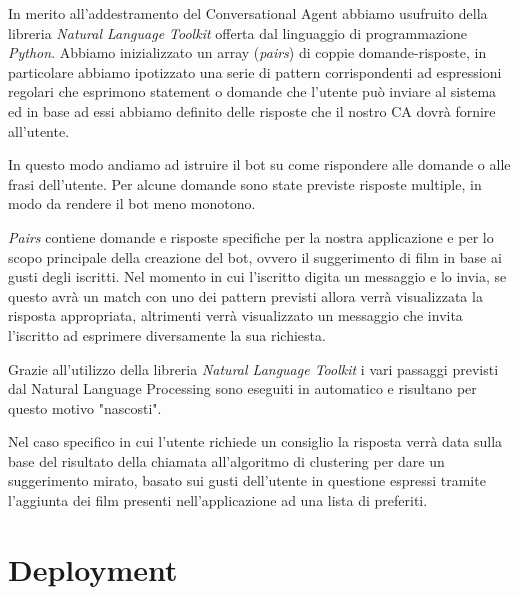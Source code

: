 \documentclass[a4paper, 10pt]{report}
\begin{document}
        In merito all'addestramento del Conversational Agent abbiamo usufruito della libreria \textit{Natural Language Toolkit}
        offerta dal linguaggio di programmazione \textit{Python}. Abbiamo inizializzato un array (\textit{pairs}) di coppie domande-risposte,
        in particolare abbiamo ipotizzato una serie di pattern corrispondenti ad espressioni regolari che esprimono statement o domande che
        l'utente può inviare al sistema ed in base ad essi abbiamo definito delle risposte che il nostro CA dovrà fornire all'utente.

        In questo modo andiamo ad istruire il bot su come rispondere alle domande o alle frasi dell'utente. Per alcune domande
        sono state previste risposte multiple, in modo da rendere il bot meno monotono.

        \textit{Pairs} contiene domande e risposte specifiche per la nostra applicazione e per lo scopo
        principale della creazione del bot, ovvero il suggerimento di film in base ai gusti degli iscritti.
        Nel momento in cui l'iscritto digita un messaggio e lo invia, se questo avrà un match con uno dei pattern previsti allora
        verrà visualizzata la risposta appropriata, altrimenti verrà visualizzato un messaggio che invita l'iscritto
        ad esprimere diversamente la sua richiesta.

        Grazie all'utilizzo della libreria \textit{Natural Language Toolkit} i vari passaggi previsti dal Natural Language Processing
        sono eseguiti in automatico e risultano per questo motivo "nascosti".

        Nel caso specifico in cui l'utente richiede un consiglio la risposta verrà data sulla base del risultato della chiamata
        all'algoritmo di clustering per dare un suggerimento mirato, basato sui gusti dell'utente in questione espressi tramite
        l'aggiunta dei film presenti nell'applicazione ad una lista di preferiti.


    \chapter{Deployment}\label{ch:deployment}
\end{document}
